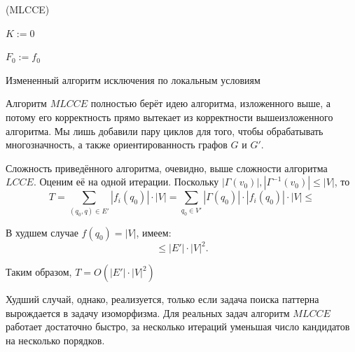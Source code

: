 \begin{algorithm}[H]
	\Large
	\Begin(MLCCE){
		$K := 0$
		
		$F_0 := f_0$
		
	}
	
	\caption{Измененный алгоритм исключения по локальным условиям}
	\label{alg:MLCCE}
\end{algorithm}

Алгоритм $MLCCE$ полностью берёт идею алгоритма, изложенного выше, а потому его корректность прямо вытекает из корректности вышеизложенного алгоритма. Мы лишь добавили пару циклов для того, чтобы обрабатывать многозначность, а также ориентированность графов $G$ и $G'$.

Сложность приведённого алгоритма, очевидно, выше сложности алгоритма $LCCE$. Оценим её на одной итерации. Поскольку $|\Gamma(v_0)|, |\Gamma^{-1}(v_0)| \le |V|$, то
\[T = \sum\limits_{(q_0, q) \in E'}  |f_i(q_0)| \cdot |V| = \sum\limits_{q_0 \in V'}  |\Gamma(q_0)|\cdot|f_i(q_0)|\cdot |V| \le \]

В худшем случае $f(q_0) = |V|$, имеем:
\[ \le |E'|\cdot|V|^2. \]

Таким образом, $T = O(|E'|\cdot|V|^2)$

Худший случай, однако, реализуется, только если задача поиска паттерна вырождается в задачу изоморфизма. Для реальных задач алгоритм $MLCCE$ работает достаточно быстро, за несколько итераций уменьшая число кандидатов на несколько порядков.

